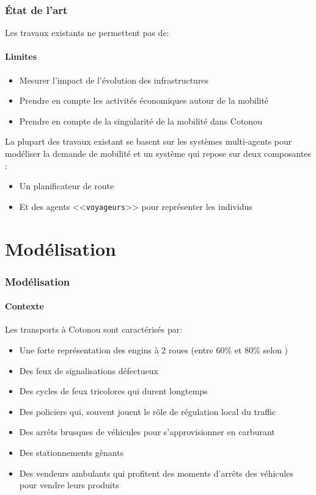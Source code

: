 \begin{frame}
    \frametitle{État de l'art}
    Les travaux existants ne permettent pas de:
    \framesubtitle{Limites}
    \begin{itemize}
        \item {} Mesurer l'impact de l'évolution des infrastructures
        \item {} Prendre en compte les activités économiques autour de la mobilité
        \item {} Prendre en compte de la singularité de la mobilité dans Cotonou
    \end{itemize}

    \pause{}
    La plupart des travaux existant se basent sur les systèmes multi-agents pour modéliser la demande de mobilité et un système qui repose sur deux composantes :
    \begin{itemize}
        \item Un planificateur de route
        \item Et des agents <<\texttt{voyageurs}>> pour représenter les individus
    \end{itemize}
\end{frame}


\section{Modélisation}\label{modelisation}

\begin{frame}
    \frametitle{Modélisation}
    \framesubtitle{Contexte}
    Les transports à Cotonou sont caractérisés par:
    \begin{itemize}
        \item Une forte représentation des engins à 2 roues (entre $60\%$ et $80\%$ selon \textcite{briod2011zemidjan})
        \item Des feux de signalisations défectueux
        \item Des cycles de feux tricolores qui durent longtemps
        \item Des policiers qui, souvent jouent le rôle de régulation local du traffic
        \item Des arrêts brusques de véhicules pour s'approvisionner en carburant
        \item Des stationnements gênants
        \item Des vendeurs ambulants qui profitent des moments d'arrêts des véhicules pour vendre leurs produits
    \end{itemize}

\end{frame}

